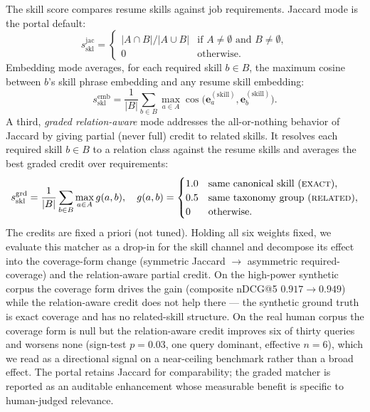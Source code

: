 The skill score compares resume skills against job requirements.
Jaccard mode is the portal default:
\begin{equation}
  s_{\mathrm{skl}}^{\mathrm{jac}} =
    \begin{cases}
      |A \cap B| / |A \cup B| & \text{if } A \neq \emptyset \text{ and } B \neq \emptyset,\\
      0 & \text{otherwise}.
    \end{cases}
  \label{eq:jaccard}
\end{equation}
Embedding mode averages, for each required skill $b \in B$, the maximum cosine between $b$'s skill phrase embedding and any resume skill embedding:
\begin{equation}
  s_{\mathrm{skl}}^{\mathrm{emb}} =
    \frac{1}{|B|} \sum_{b \in B}
    \max_{a \in A} \cos\!\bigl(\mathbf{e}_a^{(\mathrm{skill})}, \mathbf{e}_b^{(\mathrm{skill})}\bigr).
  \label{eq:skill-embed}
\end{equation}
A third, \emph{graded relation-aware} mode addresses the all-or-nothing behavior of Jaccard by giving partial (never full) credit to related skills. It resolves each required skill $b \in B$ to a relation class against the resume skills and averages the best graded credit over requirements:
\begin{equation}
  s_{\mathrm{skl}}^{\mathrm{grd}} = \frac{1}{|B|}\sum_{b \in B} \max_{a \in A} g(a,b),\quad
  g(a,b) = \begin{cases} 1.0 & \text{same canonical skill (\textsc{exact})},\\ 0.5 & \text{same taxonomy group (\textsc{related})},\\ 0 & \text{otherwise}. \end{cases}
  \label{eq:skill-graded}
\end{equation}
The credits are fixed a priori (not tuned). Holding all six weights fixed, we evaluate this matcher as a drop-in for the skill channel and decompose its effect into the coverage-form change (symmetric Jaccard $\to$ asymmetric required-coverage) and the relation-aware partial credit. On the high-power synthetic corpus the coverage form drives the gain (composite nDCG@5 $0.917 \to 0.949$) while the relation-aware credit does not help there --- the synthetic ground truth is exact coverage and has no related-skill structure. On the real human corpus the coverage form is null but the relation-aware credit improves six of thirty queries and worsens none (sign-test $p{=}0.03$, one query dominant, effective $n{=}6$), which we read as a directional signal on a near-ceiling benchmark rather than a broad effect. The portal retains Jaccard for comparability; the graded matcher is reported as an auditable enhancement whose measurable benefit is specific to human-judged relevance.

